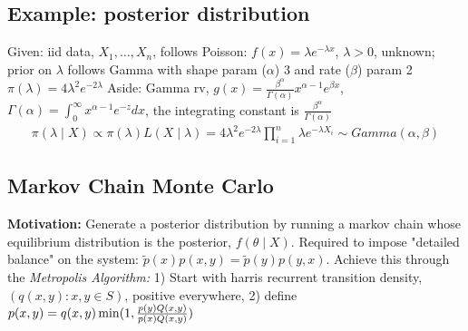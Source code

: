 \documentclass[9pt]{extarticle}
\begin{document}
\subsection{Example: posterior distribution}
Given: iid data, $X_1, \dots, X_n$, follows Poisson: $f(x) = \lambda e^{-\lambda x}$, $\lambda > 0$, unknown; prior on $\lambda$ follows Gamma with shape param ($\alpha$) 3 and rate ($\beta$) param 2$\pi(\lambda) = 4\lambda^2e^{-2\lambda}$
Aside: Gamma rv, $g(x) = \frac{\beta^\alpha}{\Gamma(\alpha)}x^{\alpha-1}e^{\beta x}$, $\Gamma(\alpha) = \int_0^\infty x^{\alpha-1}e^{-z}dx$, the integrating constant is $\frac{\beta^\alpha}{\Gamma(\alpha)}$
\begin{align*}
    \pi(\lambda \mid X) \propto \pi(\lambda) L(X \mid \lambda) = 4\lambda^2e^{-2\lambda} \prod_{i=1}^n \lambda e^{-\lambda X_i}  \sim Gamma(\alpha, \beta)
\end{align*}



\subsection{Markov Chain Monte Carlo}
\textbf{Motivation:} Generate a posterior distribution by running a markov chain whose equilibrium distribution is the posterior, $f(\theta \mid X)$. Required to impose "detailed balance" on the system: $\tilde{p}(x)p(x,y) = \tilde{p}(y)p(y,x)$. Achieve this through the \textit{Metropolis Algorithm:} 1) Start with harris recurrent transition density, $(q(x,y): x,y \in S)$, positive everywhere, 2) define $p(x,y) = q(x,y) \min\large (1, \frac{p(y)Q(x,y)}{p(x)Q(x,y)} \large )$
\end{document}
